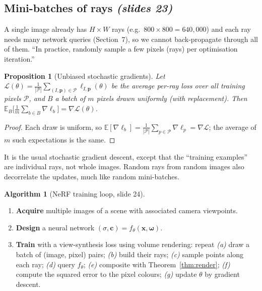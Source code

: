 \documentclass[11pt,a4paper]{article}
\newcommand{\E}{\mathbb{E}}
\newcommand{\xx}{\boldsymbol{x}}
\newcommand{\om}{\boldsymbol{\omega}}
\newcommand{\cc}{\boldsymbol{c}}
\newcommand{\sref}[1]{\texorpdfstring{\emph{(slides #1)}}{(slides #1)}}
\theoremstyle{definition}
\newtheorem{algorithm}{Algorithm}[section]
\theoremstyle{plain}
\newtheorem{proposition}{Proposition}[section]
\begin{document}
\subsection{Mini-batches of rays \sref{23}}

A single image already has $H\times W$ rays (e.g.\ $800\times800=640{,}000$) and each ray needs many network queries (Section~7), so we cannot back-propagate through all of them. ``In practice, randomly sample a few pixels (rays) per optimisation iteration.''

\begin{proposition}[Unbiased stochastic gradients]
Let $\mathcal L(\theta)=\frac1{|\mathcal P|}\sum_{(I,\boldsymbol p)\in\mathcal P}\ell_{I,\boldsymbol p}(\theta)$ be the average per-ray loss over all training pixels $\mathcal P$, and $B$ a batch of $m$ pixels drawn uniformly (with replacement). Then $\E_B\big[\frac1m\sum_{b\in B}\nabla\ell_b\big]=\nabla\mathcal L(\theta)$.
\end{proposition}
\begin{proof}
Each draw is uniform, so $\E[\nabla\ell_b]=\frac1{|\mathcal P|}\sum_{p\in\mathcal P}\nabla\ell_p=\nabla\mathcal L$; the average of $m$ such expectations is the same.
\end{proof}
\begin{intuition}
It is the usual stochastic gradient descent, except that the ``training examples'' are individual rays, not whole images. Random rays from random images also decorrelate the updates, much like random mini-batches.
\end{intuition}

\begin{algorithm}[NeRF training loop, slide 24]\label{alg:train}
\begin{enumerate}[nosep]
\item \textbf{Acquire} multiple images of a scene with associated camera viewpoints.
\item \textbf{Design} a neural network $(\sigma,\cc)=f_\theta(\xx,\om)$.
\item \textbf{Train} with a view-synthesis loss using volume rendering: repeat \emph{(a)} draw a batch of (image, pixel) pairs; \emph{(b)} build their rays; \emph{(c)} sample points along each ray; \emph{(d)} query $f_\theta$; \emph{(e)} composite with Theorem~\ref{thm:render}; \emph{(f)} compute the squared error to the pixel colours; \emph{(g)} update $\theta$ by gradient descent.
\end{enumerate}
\end{algorithm}
\end{document}
